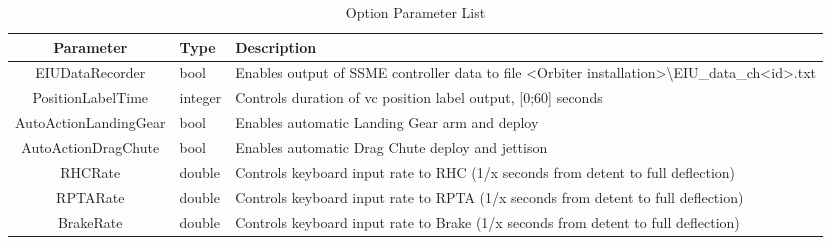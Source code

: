\documentclass[Space_Shuttle_Vessel_Manual.tex]{subfiles}
\begin{document}
\begin{table}[H]
  \centering
  \begin{tabularx}{470pt}{c | >{\centering\arraybackslash}p{50pt} | >{\centering\arraybackslash}p{300pt}}
    \textbf{Parameter} & \textbf{Type} & \textbf{Description} \\
    \hline
	EIUDataRecorder & bool & Enables output of SSME controller data to file <Orbiter installation>\textbackslash EIU\_data\_ch<id>.txt\\
	\hline\rule{0pt}{2ex}
	PositionLabelTime & integer & Controls duration of vc position label output, [0;60] seconds\\
	\hline\rule{0pt}{2ex}
	AutoActionLandingGear & bool & Enables automatic Landing Gear arm and deploy\\
	\hline\rule{0pt}{2ex}
	AutoActionDragChute & bool & Enables automatic Drag Chute deploy and jettison\\
	\hline\rule{0pt}{2ex}
	RHCRate & double & Controls keyboard input rate to RHC (1/x seconds from detent to full deflection)\\
	\hline\rule{0pt}{2ex}
	RPTARate & double & Controls keyboard input rate to RPTA (1/x seconds from detent to full deflection)\\
	\hline\rule{0pt}{2ex}
	BrakeRate & double & Controls keyboard input rate to Brake (1/x seconds from detent to full deflection)
	\end{tabularx}
  \caption{Option Parameter List}
  \label{tab:OptionParameterList}
\end{table}
\end{document}
